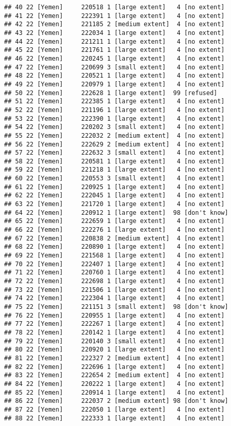 \documentclass[]{article}
\begin{document}
\begin{verbatim}
## 40 22 [Yemen]     220518 1 [large extent]   4 [no extent] 
## 41 22 [Yemen]     222391 1 [large extent]   4 [no extent] 
## 42 22 [Yemen]     221185 2 [medium extent]  4 [no extent] 
## 43 22 [Yemen]     222034 1 [large extent]   4 [no extent] 
## 44 22 [Yemen]     221211 1 [large extent]   4 [no extent] 
## 45 22 [Yemen]     221761 1 [large extent]   4 [no extent] 
## 46 22 [Yemen]     220245 1 [large extent]   4 [no extent] 
## 47 22 [Yemen]     220699 3 [small extent]   4 [no extent] 
## 48 22 [Yemen]     220521 1 [large extent]   4 [no extent] 
## 49 22 [Yemen]     220979 1 [large extent]   4 [no extent] 
## 50 22 [Yemen]     222628 1 [large extent]  99 [refused]   
## 51 22 [Yemen]     222385 1 [large extent]   4 [no extent] 
## 52 22 [Yemen]     221196 1 [large extent]   4 [no extent] 
## 53 22 [Yemen]     222390 1 [large extent]   4 [no extent] 
## 54 22 [Yemen]     220202 3 [small extent]   4 [no extent] 
## 55 22 [Yemen]     222032 2 [medium extent]  4 [no extent] 
## 56 22 [Yemen]     222629 2 [medium extent]  4 [no extent] 
## 57 22 [Yemen]     222632 3 [small extent]   4 [no extent] 
## 58 22 [Yemen]     220581 1 [large extent]   4 [no extent] 
## 59 22 [Yemen]     221218 1 [large extent]   4 [no extent] 
## 60 22 [Yemen]     220553 3 [small extent]   4 [no extent] 
## 61 22 [Yemen]     220925 1 [large extent]   4 [no extent] 
## 62 22 [Yemen]     222045 1 [large extent]   4 [no extent] 
## 63 22 [Yemen]     221720 1 [large extent]   4 [no extent] 
## 64 22 [Yemen]     220912 1 [large extent]  98 [don't know]
## 65 22 [Yemen]     222659 1 [large extent]   4 [no extent] 
## 66 22 [Yemen]     222276 1 [large extent]   4 [no extent] 
## 67 22 [Yemen]     220838 2 [medium extent]  4 [no extent] 
## 68 22 [Yemen]     220890 1 [large extent]   4 [no extent] 
## 69 22 [Yemen]     221568 1 [large extent]   4 [no extent] 
## 70 22 [Yemen]     222407 1 [large extent]   4 [no extent] 
## 71 22 [Yemen]     220760 1 [large extent]   4 [no extent] 
## 72 22 [Yemen]     222698 1 [large extent]   4 [no extent] 
## 73 22 [Yemen]     221506 1 [large extent]   4 [no extent] 
## 74 22 [Yemen]     222304 1 [large extent]   4 [no extent] 
## 75 22 [Yemen]     221151 3 [small extent]  98 [don't know]
## 76 22 [Yemen]     220955 1 [large extent]   4 [no extent] 
## 77 22 [Yemen]     222267 1 [large extent]   4 [no extent] 
## 78 22 [Yemen]     220142 1 [large extent]   4 [no extent] 
## 79 22 [Yemen]     220140 3 [small extent]   4 [no extent] 
## 80 22 [Yemen]     220920 1 [large extent]   4 [no extent] 
## 81 22 [Yemen]     222327 2 [medium extent]  4 [no extent] 
## 82 22 [Yemen]     222696 1 [large extent]   4 [no extent] 
## 83 22 [Yemen]     222654 2 [medium extent]  4 [no extent] 
## 84 22 [Yemen]     220222 1 [large extent]   4 [no extent] 
## 85 22 [Yemen]     220914 1 [large extent]   4 [no extent] 
## 86 22 [Yemen]     222037 2 [medium extent] 98 [don't know]
## 87 22 [Yemen]     222050 1 [large extent]   4 [no extent] 
## 88 22 [Yemen]     222333 1 [large extent]   4 [no extent]
\end{verbatim}
\end{document}
